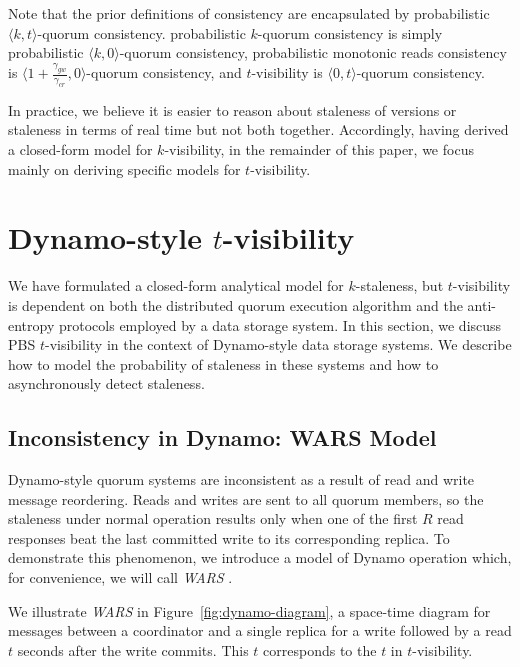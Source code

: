 \documentclass{vldb}
\begin{document}
Note that the prior definitions of consistency are encapsulated by
probabilistic $\langle k, t \rangle$-quorum consistency. probabilistic
$k$-quorum consistency is simply probabilistic $\langle k, 0
\rangle$-quorum consistency, probabilistic monotonic reads consistency
is $\langle 1+\frac{\gamma_{gw}}{\gamma_{cr}}, 0 \rangle$-quorum
consistency, and $t$-visibility is $\langle 0, t \rangle$-quorum
consistency.

In practice, we believe it is easier to reason about staleness of
versions or staleness in terms of real time but not both together.
Accordingly, having derived a closed-form model for $k$-visibility, in
the remainder of this paper, we focus mainly on deriving specific models
for $t$-visibility.

\section{Dynamo-style $t$-visibility}
\label{sec:dynamo}

We have formulated a closed-form analytical model for $k$-staleness,
but $t$-visibility is dependent on both the distributed quorum
execution algorithm and the anti-entropy protocols employed by a data
storage system.  In this section, we discuss PBS $t$-visibility in the
context of Dynamo-style data storage systems.  We describe how to
model the probability of staleness in these systems and how to
asynchronously detect staleness.

\subsection{Inconsistency in Dynamo: WARS Model}

Dynamo-style quorum systems are inconsistent as a result of read and
write message reordering.  Reads and writes are sent to all quorum
members, so the staleness under normal operation results only when one
of the first $R$ read responses beat the last committed write to its
corresponding replica.  To demonstrate this phenomenon, we introduce a
model of Dynamo operation which, for convenience, we will call \textit{WARS} .

We illustrate \textit{WARS} in Figure~\ref{fig:dynamo-diagram}, a space-time
diagram for messages between a coordinator and a single replica for a
write followed by a read $t$ seconds after the write commits.
This $t$ corresponds to the $t$ in $t$-visibility.
\end{document}
